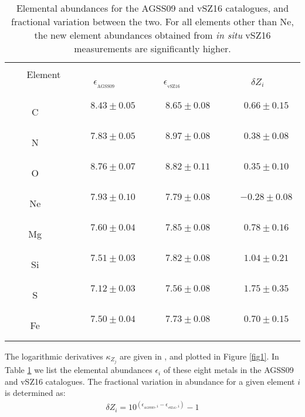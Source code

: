 \documentclass[aps,prl,twocolumn,showpacs]{revtex4}
\begin{document}
\begin{table}[tb]
\caption{Elemental abundances for the AGSS09 and vSZ16 catalogues, and fractional variation between the two. For all elements other than Ne, the new element abundances obtained from \textit{in situ} vSZ16 measurements are significantly higher.}
\label{tab1}
\begin{tabular}{c c c c}
\hline\hline \vspace{-4mm}\\
 \ \ \ Element \ \ \ & \ \ \ $\epsilon_{_{\text{AGSS09}}}$ \ \ \ & $\epsilon_{_{\text{vSZ16}}}$ \ \ \ & \ \ \ $\delta Z_i$ \ \ \ \\      
\hline
 \ \ \ C \ \ \ & \ \ \ $8.43 \pm 0.05$ \ \ \ & \ \ \ $8.65 \pm 0.08$ \ \ \ & \ \ \ $0.66 \pm 0.15$ \ \ \ \\
 \ \ \ N  \ \ \ & \ \ \ $7.83 \pm 0.05$ \ \ \ & \ \ \ $8.97 \pm 0.08$ \ \ \ & \ \ \ $0.38 \pm 0.08$ \ \ \ \\
 \ \ \ O \ \ \ & \ \ \ $8.76 \pm 0.07$ \ \ \ & \ \ \ $8.82 \pm 0.11$ \ \ \ & \ \ \ $0.35 \pm 0.10$ \ \ \ \\
 \ \ \ Ne \ \ \ & \ \ \ $7.93 \pm 0.10$ \ \ \ & \ \ \ $7.79 \pm 0.08$ \ \ \ & \ \ \ $-0.28 \pm 0.08$ \ \ \ \\
 \ \ \ Mg \ \ \ & \ \ \ $7.60 \pm 0.04$ \ \ \ & \ \ \ $7.85 \pm 0.08$ \ \ \ & \ \ \ $0.78 \pm 0.16$ \ \ \ \\
 \ \ \ Si \ \ \ & \ \ \ $7.51 \pm 0.03$ \ \ \ & \ \ \ $7.82 \pm 0.08$ \ \ \ & \ \ \ $1.04 \pm 0.21$ \ \ \ \\
 \ \ \ S \ \ \ & \ \ \ $7.12 \pm 0.03$ \ \ \ & \ \ \ $7.56 \pm 0.08$ \ \ \ & \ \ \ $1.75 \pm 0.35$ \ \ \ \\
 \ \ \ Fe \ \ \ & \ \ \ $7.50 \pm 0.04$ \ \ \ & \ \ \ $7.73 \pm 0.08$ \ \ \ & \ \ \ $0.70 \pm 0.15$ \ \ \ \\
\hline
\end{tabular}
\end{table}
The logarithmic derivatives $\kappa _{Z_j}$ are given in \cite{villante3}, and plotted in Figure \ref{fig1}. In Table \ref{tab1} we list the elemental abundances $\epsilon _i$ of these eight metals in the AGSS09 and vSZ16 catalogues. The fractional variation in abundance for a given element $i$ is determined as:
%
\begin{eqnarray}
\delta Z_i = 10^{(\epsilon_{_{\text{AGSS09}},i}-\epsilon_{_{\text{vSZ16}},i})}-1
\end{eqnarray}
%
\end{document}
